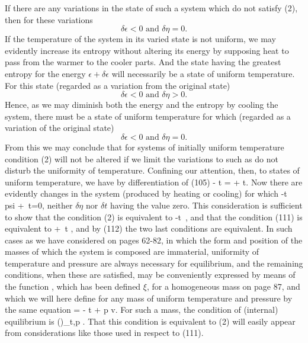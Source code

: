 \documentclass[12pt]{article}
\begin{document}
If there are any variations in the state of such a system which do
not satisfy (2), then for these variations
$$\delta \epsilon < 0 \text{  and  } \delta \eta = 0.$$
If the temperature of the system in its varied state is not uniform, we may evidently increase its entropy without altering its energy by supposing heat to pass from the warmer to the cooler parts. And the state having the greatest entropy for the energy $\epsilon + \delta \epsilon$ will necessarily  be a state of uniform temperature. For this state (regarded as a variation from the original state)
$$\delta \epsilon < 0 \text{  and  } \delta \eta > 0.$$
Hence, as we may diminish both the energy and the entropy by cooling the system, there must be a state of uniform temperature for which (regarded as a variation of the original state)
$$\delta \epsilon < 0 \text{  and  } \delta \eta = 0.$$
From this we may conclude that for systems of initially uniform temperature condition (2) will not be altered if we limit the variations to such as do not disturb the uniformity of temperature.
Confining our attention, then, to states of uniform temperature, we
have by differentiation of (105)
\eqs \delta \epsilon- t \delta \eta = \delta \psi + \eta \delta t.              \label{112}\eqe
Now there are evidently changes in the system (produced by heating or cooling) for which
\eqs \delta \epsilon -t \,\delta {} \delta psi + \eta \,\delta t=0,         \label{113}\eqe
neither $\delta \eta$ nor $\delta t$ having the value zero. This consideration is sufficient to show that the condition (2) is equivalent to
\eqs \delta \epsilon -t \,\delta \eta {},                      \label{114}\eqe
and that the condition (111) is equivalent to
\eqs \delta \psi + \eta \,\delta t ,                      \label{115}\eqe
and by (112) the two last conditions are equivalent.
In such cases as we have considered on pages 62-82, in which the form and position of the masses of which the system is composed are immaterial, uniformity of temperature and pressure are always necessary for equilibrium, and the remaining conditions, when these are satisfied, may be conveniently expressed by means of the function , which has been defined $\xi$, for a homogeneous mass on page 87, and which we will here define for any mass of uniform temperature and pressure by the same equation
\eqs \xi = \epsilon - t \eta + p v.  \label{116}\eqe
For such a mass, the condition of (internal) equilibrium is
\eqs (\delta \xi)_{t,p} .  \label{117}\eqe
That this condition is equivalent to (2) will easily appear from considerations like those used in respect to (111).
\end{document}
